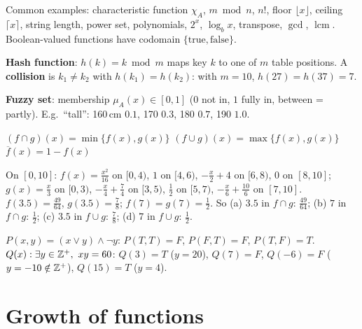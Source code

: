 \documentclass{fkt-notes}
\DeclareMathOperator{\lcm}{lcm}
\newcommand{\src}[1]{\par\noindent{\small\itshape Source: #1}\par\smallskip}
\newcommand{\kolman}[1]{\setcounter{section}{\numexpr#1-1\relax}}
\theoremstyle{definition}
\begin{document}
Common examples: characteristic function $\chi_A$, $m\bmod n$, $n!$,
floor $\lfloor x\rfloor$, ceiling $\lceil x\rceil$, string length,
power set, polynomials, $2^x$, $\log_bx$, transpose, $\gcd$, $\lcm$.
Boolean-valued functions have codomain $\{\text{true},\text{false}\}$.

\textbf{Hash function}: $h(k)=k\bmod m$ maps key $k$ to one of $m$ table
positions. A \textbf{collision} is $k_1\neq k_2$ with $h(k_1)=h(k_2)$:
with $m=10$, $h(27)=h(37)=7$.

\textbf{Fuzzy set}: membership $\mu_A(x)\in[0,1]$ ($0$ not in, $1$ fully
in, between = partly). E.g.\ ``tall'': 160\,cm $0.1$, 170 $0.3$, 180 $0.7$,
190 $1.0$.
\begin{rulebox}[title=Fuzzy operations (Theorem 5.2.1)]
  $(f\cap g)(x)=\min\{f(x),g(x)\}$ \qquad
  $(f\cup g)(x)=\max\{f(x),g(x)\}$ \qquad
  $\overline f(x)=1-f(x)$
\end{rulebox}
\begin{example}
  On $[0,10]$:
  $f(x)=\frac{x^2}{16}$ on $[0,4)$, $1$ on $[4,6)$, $-\frac x2+4$ on $[6,8)$,
  $0$ on $[8,10]$;\
  $g(x)=\frac x3$ on $[0,3)$, $-\frac x4+\frac74$ on $[3,5)$, $\frac12$ on
  $[5,7)$, $-\frac x6+\frac{10}6$ on $[7,10]$.\\
  $f(3.5)=\frac{49}{64}$, $g(3.5)=\frac78$; $f(7)=g(7)=\frac12$.
  So (a) $3.5$ in $f\cap g$: $\frac{49}{64}$; (b) $7$ in $f\cap g$:
  $\frac12$; (c) $3.5$ in $f\cup g$: $\frac78$; (d) $7$ in $f\cup g$: $\frac12$.
\end{example}

\begin{example}
  $P(x,y)=(x\vee y)\wedge\neg y$: $P(T,T)=F$, $P(F,T)=F$, $P(T,F)=T$.\\
  $Q(x):\exists y\in\mathbb{Z}^+,\ xy=60$: $Q(3)=T$ ($y=20$), $Q(7)=F$,
  $Q(-6)=F$ ($y=-10\notin\mathbb{Z}^+$), $Q(15)=T$ ($y=4$).
\end{example}

\kolman{3}
\section{Growth of functions}\src{Kolman 5.3}\label{qg:growth}
%
\end{document}
